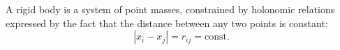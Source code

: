 A rigid body is a system of point masses, constrained by holonomic relations expressed by the fact that the distance between any two points is constant:
$$
|x_i - x_j| = r_{ij} = \text{const}.
$$
